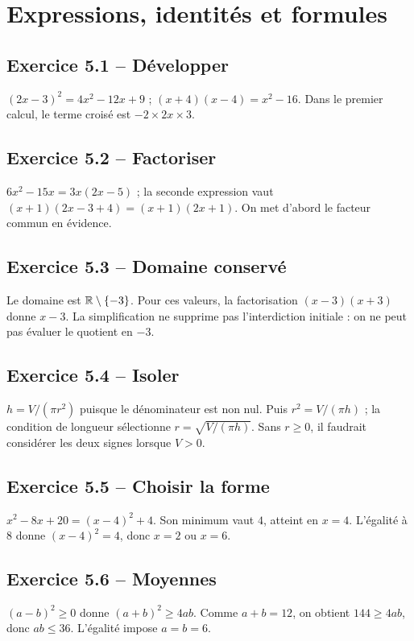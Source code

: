 \chapter{Expressions, identités et formules}
\section*{Exercice 5.1 -- Développer}
$(2x-3)^2=4x^2-12x+9$ ; $(x+4)(x-4)=x^2-16$. Dans le premier calcul, le terme croisé est $-2\times2x\times3$.

\section*{Exercice 5.2 -- Factoriser}
$6x^2-15x=3x(2x-5)$ ; la seconde expression vaut $(x+1)(2x-3+4)=(x+1)(2x+1)$. On met d'abord le facteur commun en évidence.

\section*{Exercice 5.3 -- Domaine conservé}
Le domaine est $\mathbb{R}\setminus\{-3\}$. Pour ces valeurs, la factorisation $(x-3)(x+3)$ donne $x-3$. La simplification ne supprime pas l'interdiction initiale : on ne peut pas évaluer le quotient en $-3$.

\section*{Exercice 5.4 -- Isoler}
$h=V/(\pi r^2)$ puisque le dénominateur est non nul. Puis $r^2=V/(\pi h)$ ; la condition de longueur sélectionne $r=\sqrt{V/(\pi h)}$. Sans $r\geq0$, il faudrait considérer les deux signes lorsque $V>0$.

\section*{Exercice 5.5 -- Choisir la forme}
$x^2-8x+20=(x-4)^2+4$. Son minimum vaut $4$, atteint en $x=4$. L'égalité à $8$ donne $(x-4)^2=4$, donc $x=2$ ou $x=6$.

\section*{Exercice 5.6 -- Moyennes}
$(a-b)^2\geq0$ donne $(a+b)^2\geq4ab$. Comme $a+b=12$, on obtient $144\geq4ab$, donc $ab\leq36$. L'égalité impose $a=b=6$.
